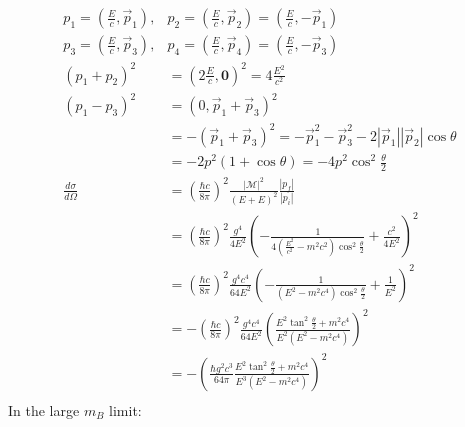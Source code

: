 \documentclass{article}
\begin{document}
\begin{equation}
    \begin{split}
        p_1 = \left(\frac{E}{c}, \vec{p}_1\right), & p_2 = \left(\frac{E}{c}, \vec{p}_2\right) = \left(\frac{E}{c}, -\vec{p}_1\right) \\
        p_3 = \left(\frac{E}{c}, \vec{p}_3\right), & p_4 = \left(\frac{E}{c}, \vec{p}_4\right) = \left(\frac{E}{c}, -\vec{p}_3\right) \\
        \left(p_1 + p_2\right)^2 & = \left(2\frac{E}{c}, \mathbf{0}\right)^2 = 4\frac{E^2}{c^2} \\
        \left(p_1 - p_3\right)^2 & = \left(0, \vec{p}_1 + \vec{p}_3\right)^2 \\
        & = -\left(\vec{p}_1 + \vec{p}_3\right)^2 = -\vec{p}_1^2 - \vec{p}_3^2 - 2|\vec{p}_1||\vec{p}_2|\cos\theta \\
        & = -2p^2\left(1 + \cos\theta\right) = -4p^2\cos^2\frac{\theta}{2} \\
        \frac{d\sigma}{d\Omega} & = \left(\frac{\hbar c}{8\pi}\right)^2\frac{\left|\mathcal{M}\right|^2}{(E + E)^2}\frac{\left|p_f\right|}{\left|p_i\right|} \\
        & = \left(\frac{\hbar c}{8\pi}\right)^2\frac{g^4}{4E^2}\left(-\frac{1}{4\left(\frac{E^2}{c^2} - m^2c^2\right)\cos^2\frac{\theta}{2}} + \frac{c^2}{4E^2}\right)^2 \\
        & = \left(\frac{\hbar c}{8\pi}\right)^2\frac{g^4c^4}{64E^2}\left(-\frac{1}{\left(E^2 - m^2c^4\right)\cos^2\frac{\theta}{2}} + \frac{1}{E^2}\right)^2 \\
        & = -\left(\frac{\hbar c}{8\pi}\right)^2\frac{g^4c^4}{64E^2}\left(\frac{E^2\tan^2\frac{\theta}{2} + m^2c^4}{E^2(E^2 - m^2c^4)}\right)^2 \\
        & = -\left(\frac{\hbar g^2c^3}{64\pi}\frac{E^2\tan^2\frac{\theta}{2} + m^2c^4}{E^3(E^2 - m^2c^4)}\right)^2 \\
    \end{split}
\end{equation}
In the large $m_B$ limit:
\end{document}
